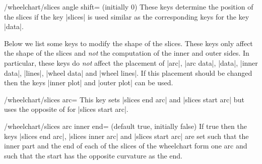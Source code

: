 \documentclass[a4paper,english,dvipsnames]{ltxdoc}
\begin{document}
\begin{key}{/wheelchart/slices angle shift= (initially 0)}
These keys determine the position of the slices if the key |slices| is used similar as the corresponding keys for the key |data|.
\end{key}
Below we list some keys to modify the shape of the slices. These keys only affect the shape of the slices and \emph{not} the computation of the inner and outer sides. In particular, these keys do \emph{not} affect the placement of |arc|, |arc data|, |data|, |inner data|, |lines|, |wheel data| and |wheel lines|. If this placement should be changed then the keys |inner plot| and |outer plot| can be used.
\begin{key}{/wheelchart/slices arc=}
This key sets |slices end arc| and |slices start arc| but uses the opposite of  for |slices start arc|.
\begin{codeexample}[width=10cm]
\begin{tikzpicture}
\wheelchart[
  slices arc={1}{0},
  wheel data=\WCcount,
  wheel data angle pos=1,
  wheel data pos=0.5,
  wheel data style={
    circle,
    fill=\WCvarB!50
  }
]{\exampleforthismanual}
\end{tikzpicture}
\end{codeexample}
\begin{codeexample}[width=10cm]
\end{codeexample}
\end{key}
\begin{key}{/wheelchart/slices arc inner end= (default true, initially false)}
If true then the keys |slices end arc|, |slices inner arc| and |slices start arc| are set such that the inner part and the end of each of the slices of the wheelchart form one arc and such that the start has the opposite curvature as the end.
\begin{codeexample}[width=10cm]
\end{codeexample}
\end{key}
\end{document}
